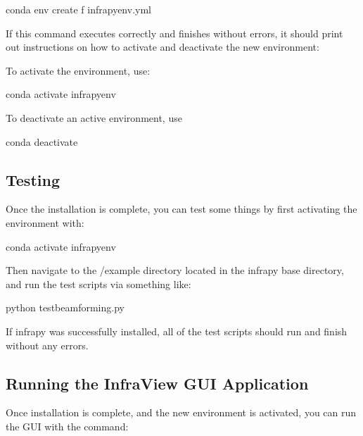 \documentclass[letterpaper,10pt,english]{sphinxmanual}
\begin{document}
\begin{sphinxVerbatim}[commandchars=\\\{\}]
\PYGZgt{}\PYGZgt{} conda env create \PYGZhy{}f infrapy\PYGZus{}env.yml
\end{sphinxVerbatim}

If this command executes correctly and finishes without errors, it should print out instructions on how to activate and deactivate the new environment:

To activate the environment, use:

\begin{sphinxVerbatim}[commandchars=\\\{\}]
\PYGZgt{}\PYGZgt{} conda activate infrapy\PYGZus{}env
\end{sphinxVerbatim}

To deactivate an active environment, use

\begin{sphinxVerbatim}[commandchars=\\\{\}]
\PYGZgt{}\PYGZgt{} conda deactivate
\end{sphinxVerbatim}


\subsection{Testing}
\label{\detokenize{installation:testing}}
Once the installation is complete, you can test some things by first activating the environment with:

\begin{sphinxVerbatim}[commandchars=\\\{\}]
\PYGZgt{}\PYGZgt{} conda activate infrapy\PYGZus{}env
\end{sphinxVerbatim}

Then navigate to the /example directory located in the infrapy base directory, and run the test scripts via something like:

\begin{sphinxVerbatim}[commandchars=\\\{\}]
\PYGZgt{}\PYGZgt{} python test\PYGZus{}beamforming.py
\end{sphinxVerbatim}

If infrapy was successfully installed, all of the test scripts should run and finish without any errors.


\subsection{Running the InfraView GUI Application}
\label{\detokenize{installation:running-the-infraview-gui-application}}
Once installation is complete, and the new environment is activated, you can run the GUI with the command:
\end{document}
